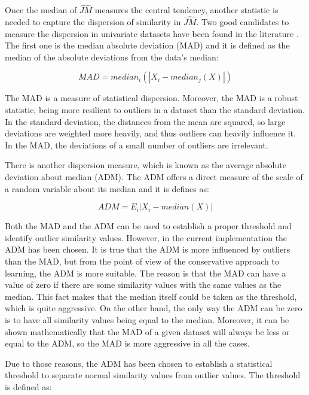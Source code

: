 
Once the median of $\hat{JM}$ measures the central tendency, another statistic is needed to capture the dispersion of similarity in $\hat{JM}$. Two good candidates to measure the dispersion in univariate datasets have been found in the literature \cite{Hoaglin1983}. The first one is the median absolute deviation (MAD) and it is defined as the median of the absolute deviations from the data's median:

\begin{equation}
\label{eq-mad}
 MAD = median_i (|X_i - median_j(X)|)
\end{equation}

The MAD is a measure of statistical dispersion. Moreover, the MAD is a robust statistic, being more resilient to outliers in a dataset than the standard deviation. In the standard deviation, the distances from the mean are squared, so large deviations are weighted more heavily, and thus outliers can heavily influence it. In the MAD, the deviations of a small number of outliers are irrelevant.

There is another dispersion measure, which is known as the average absolute deviation about median (ADM). The ADM offers a direct measure of the scale of a random variable about its median and it is defines as:

\begin{equation}
 \label{eq-adm}
 ADM = E_i |X_i - median(X)|
\end{equation}

Both the MAD and the ADM can be used to establish a proper threshold and identify outlier similarity values. However, in the current implementation the ADM has been chosen. It is true that the ADM is more influenced by outliers than the MAD, but from the point of view of the conservative approach to learning, the ADM is more suitable. The reason is that the MAD can have a value of zero if there are some similarity values with the same values as the median. This fact makes that the median itself could be taken as the threshold, which is quite aggressive. On the other hand, the only way the ADM can be zero is to have all similarity values being equal to the median. Moreover, it can be shown mathematically that the MAD of a given dataset will always be less or equal to the ADM, so the MAD is more aggressive in all the cases. 

Due to those reasons, the ADM has been chosen to establish a statistical threshold to separate normal similarity values from outlier values. The threshold is defined as:

